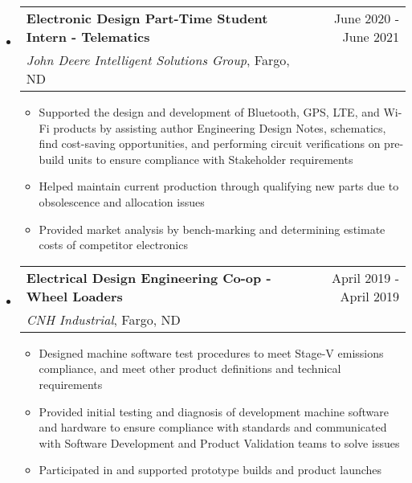 \documentclass[letterpaper,11pt]{article}
\makeatletter
\newcommand{\sectionStart}{
  \begin{itemize}[label={},leftmargin=0in]
}
\newcommand{\sectionEnd}{
  \end{itemize}
}
\newcommand{\jobHeading}[4]{
  \vspace{-1pt}
  \item
  \begin{tabular*}{1.0\textwidth}{l@{\extracolsep{\fill}}r@{}}
    \normalsize{\textbf{#1}} & #2 \\
    \textit{\small#3}, {#4}\\
  \end{tabular*}\vspace{-5pt}
}
\newcommand{\listStart}{\begin{itemize}}
\newcommand{\listEnd}{\end{itemize}\vspace{-5pt}}
\newcommand{\bulletItem}[1]{
  \item
  \small{
    {#1 \vspace{-1.8pt}}
  }
}
\makeatother
\begin{document}
\sectionStart
  \jobHeading
    {Electronic Design Part-Time Student Intern - Telematics}
    {June 2020 - June 2021}
    {John Deere Intelligent Solutions Group}
    {Fargo, ND}
  \listStart
    \bulletItem
    {Supported the design and development of Bluetooth, GPS, LTE, and Wi-Fi products by assisting author Engineering Design Notes, schematics, find cost-saving opportunities, and performing circuit verifications on pre-build units to ensure compliance with Stakeholder requirements}
    \bulletItem
    {Helped maintain current production through qualifying new parts due to obsolescence and allocation issues}
    \bulletItem
    {Provided market analysis by bench-marking and determining estimate costs of competitor electronics}
  \listEnd
\sectionEnd

\sectionStart
  \jobHeading
    {Electrical Design Engineering Co-op - Wheel Loaders}
    {April 2019 - April 2019}
    {CNH Industrial}
    {Fargo, ND}
  \listStart
    \bulletItem
    {Designed machine software test procedures to meet Stage-V emissions compliance, and meet other product definitions and technical requirements}
    \bulletItem
    {Provided initial testing and diagnosis of development machine software and hardware to ensure compliance with standards and communicated with Software Development and Product Validation teams to solve issues}
    \bulletItem
    {Participated in and supported prototype builds and product launches}
  \listEnd
\sectionEnd
\end{document}
